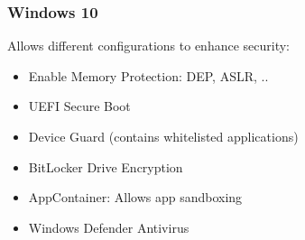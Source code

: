 \subsubsection{Windows 10}
Allows different configurations to enhance security:
\begin{itemize}
    \item Enable Memory Protection: DEP, ASLR, ..
    \item UEFI Secure Boot
    \item Device Guard (contains whitelisted applications)
    \item BitLocker Drive Encryption
    \item AppContainer: Allows app sandboxing
    \item Windows Defender Antivirus
\end{itemize}{}



